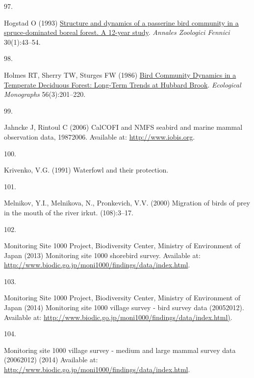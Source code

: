 \documentclass{article}
\newlength{\cslhangindent}
\newlength{\csllabelwidth}
\newlength{\cslentryspacingunit} %
\newenvironment{CSLReferences}[2] %
 {%
  \setlength{\parindent}{0pt}
  \ifodd #1
  \let\oldpar\par
  \def\par{\hangindent=\cslhangindent\oldpar}
  \fi
  \setlength{\parskip}{#2\cslentryspacingunit}
 }%
 {}
\newcommand{\CSLLeftMargin}[1]{\parbox[t]{\csllabelwidth}{#1}}
\newcommand{\CSLRightInline}[1]{\parbox[t]{\linewidth - \csllabelwidth}{#1}\break}
\begin{document}
\begin{CSLReferences}{0}{0}
\leavevmode{}%
\CSLLeftMargin{97. }%
\CSLRightInline{Hogstad O (1993)
\href{https://www.jstor.org/stable/23735355}{Structure and dynamics of a
passerine bird community in a spruce-dominated boreal forest. A 12-year
study}. \emph{Annales Zoologici Fennici} 30(1):43--54.}

\leavevmode{}%
\CSLLeftMargin{98. }%
\CSLRightInline{Holmes RT, Sherry TW, Sturges FW (1986)
\href{https://doi.org/10.2307/2937074}{Bird Community Dynamics in a
Temperate Deciduous Forest: Long-Term Trends at Hubbard Brook}.
\emph{Ecological Monographs} 56(3):201--220.}

\leavevmode{}%
\CSLLeftMargin{99. }%
\CSLRightInline{Jahncke J, Rintoul C (2006) CalCOFI and NMFS seabird and
marine mammal observation data, 1987{\textendash}2006. Available at:
\url{http://www.iobis.org}.}

\leavevmode{}%
\CSLLeftMargin{100. }%
\CSLRightInline{Krivenko, V.G. (1991) Waterfowl and their protection.}

\leavevmode{}%
\CSLLeftMargin{101. }%
\CSLRightInline{Melnikov, Y.I., Melnikova, N., Pronkevich, V.V. (2000)
Migration of birds of prey in the mouth of the river irkut.
(108):3--17.}

\leavevmode{}%
\CSLLeftMargin{102. }%
\CSLRightInline{Monitoring Site 1000 Project, Biodiversity Center,
Ministry of Environment of Japan (2013) Monitoring site 1000 shorebird
survey. Available at:
\url{http://www.biodic.go.jp/moni1000/findings/data/index.html}.}

\leavevmode{}%
\CSLLeftMargin{103. }%
\CSLRightInline{Monitoring Site 1000 Project, Biodiversity Center,
Ministry of Environment of Japan (2014) Monitoring site 1000 village
survey - bird survey data (2005{\textendash}2012). Available at:
\url{http://www.biodic.go.jp/moni1000/findings/data/index.html)}.}

\leavevmode{}%
\CSLLeftMargin{104. }%
\CSLRightInline{Monitoring site 1000 village survey - medium and large
mammal survey data (2006{\textendash}2012) (2014) Available at:
\url{http://www.biodic.go.jp/moni1000/findings/data/index.html}.}


\end{CSLReferences}
\end{document}
